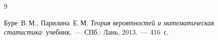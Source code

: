 \begin{thebibliography}{9}

    Буре~В.\,М., Парилина~Е.\,М.
    \emph{Теория вероятностей и математическая статистика}: учебник.~---
    СПб.: Лань, 2013.~--- 416~с.
\end{thebibliography}
